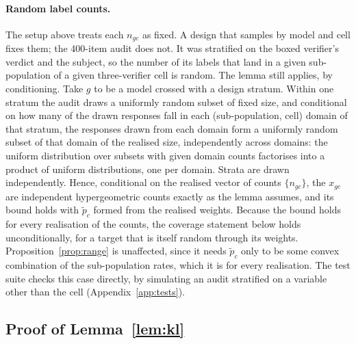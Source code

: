 \paragraph{Random label counts.}
The setup above treats each $n_{gc}$ as fixed. A design that samples by model and cell fixes them;
the 400-item audit does not. It was stratified on the
boxed verifier's verdict and the subject, so the number of its labels that land in a given
sub-population of a given three-verifier cell is random. The lemma still applies, by
conditioning. Take $g$ to be a model crossed with a design stratum. Within one stratum the
audit draws a uniformly random subset of fixed size, and conditional on how many of the drawn
responses fall in each (sub-population, cell) domain of that stratum, the responses drawn from
each domain form a uniformly random subset of that domain of the realised size, independently
across domains: the uniform distribution over subsets with given domain counts factorises into
a product of uniform distributions, one per domain. Strata are drawn independently. Hence,
conditional on the realised vector of counts $\{n_{gc}\}$, the $x_{gc}$ are independent
hypergeometric counts exactly as the lemma assumes, and its bound holds with $\tilde p_c$
formed from the realised weights. Because the bound holds for every realisation of the counts,
the coverage statement below holds unconditionally, for a target that is itself random through
its weights. Proposition~\ref{prop:range} is unaffected, since it needs $\tilde p_c$ only to be
some convex combination of the sub-population rates, which it is for every realisation. The
test suite checks this case directly, by simulating an audit stratified on a variable other
than the cell (Appendix~\ref{app:tests}).

\subsection{Proof of Lemma~\ref{lem:kl}}

